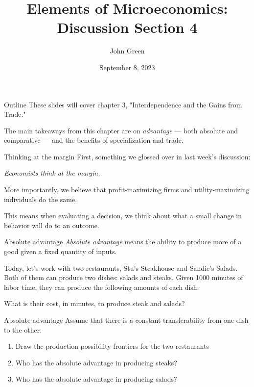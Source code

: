 \documentclass[aspectratio=169]{beamer}
\title{Elements of Microeconomics: \\
       Discussion Section 4}
\author{John Green}
\date{September 8, 2023}
\begin{document}
\begin{frame}
    \titlepage 
\end{frame}

\begin{frame}{Outline}
    These slides will cover chapter 3, "Interdependence and the Gains from Trade."

    \medskip

    The main takeaways from this chapter are on \textit{advantage} --- both absolute and comparative --- and the benefits of specialization and trade.
\end{frame}

\begin{frame}{Thinking at the margin}
    First, something we glossed over in last week's discussion:

    \begin{center}
        \textit{Economists think at the margin.}
    \end{center}

    \medskip

    More importantly, we believe that profit-maximizing firms and utility-maximizing individuals do the same.

    \medskip

    This means when evaluating a decision, we think about what a small change in behavior will do to an outcome.

\end{frame}

\begin{frame}{Absolute advantage}
    \textit{Absolute advantage} means the ability to produce more of a good given a fixed quantity of inputs.
    
    \medskip

    Today, let's work with two restaurants, Stu's Steakhouse and Sandie's Salads. Both of them can produce two dishes: salads and steaks. Given 1000 minutes of labor time, they can produce the following amounts of each dish:

    

    What is their cost, in minutes, to produce steak and salads?
\end{frame} 

\begin{frame}{Absolute advantage}
    Assume that there is a constant transferability from one dish to the other:
    \begin{enumerate}
        \item Draw the production possibility frontiers for the two restaurants
        \item Who has the absolute advantage in producing steaks?
        \item Who has the absolute advantage in producing salads?
    \end{enumerate}
\end{frame} 
\end{document}

